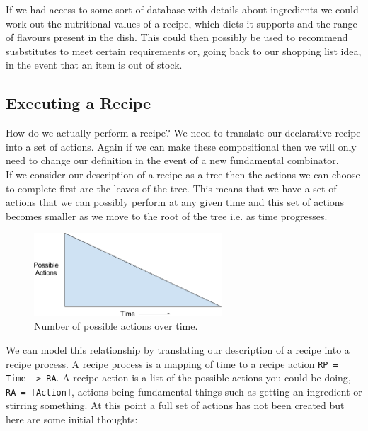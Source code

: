 \documentclass[11pt]{article}
\begin{document}
    If we had access to some sort of database with details about ingredients we could
    work out the nutritional values of a recipe, which diets it supports and the range
    of flavours present in the dish. This could then possibly be used to recommend
    susbstitutes to meet certain requirements or, going back to our shopping list idea,
    in the event that an item is out of stock. \\

    \subsection{Executing a Recipe}

    How do we actually perform a recipe? We need to translate our declarative
    recipe into a set of actions. Again if we can make these compositional
    then we will only need to change our definition in the event of a
    new fundamental combinator. \\
    
    If we consider our description of a recipe as a tree then the actions
    we can choose to complete first are the leaves of the tree. This means
    that we have a set of actions that we can possibly perform at any given
    time and this set of actions becomes smaller as we move to the root of
    the tree i.e. as time progresses. \\

    \begin{figure}[ht]
        \centering
            \includegraphics[width=7cm,keepaspectratio]{actions_time.png}
        \caption{Number of possible actions over time.}
    \end{figure}
    
    We can model this relationship by translating our description of a recipe into a recipe process.
    A recipe process is a mapping of time to a recipe action \texttt{RP = Time -> RA}.
    A recipe action is a list of the possible actions you could be doing,
    \texttt{RA = [Action]}, actions being fundamental things such as getting
    an ingredient or stirring something. At this point a full set of actions
    has not been created but here are some initial thoughts:
\end{document}
